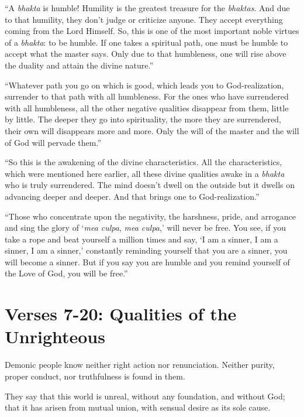 \enquote{A \textit{bhakta} is humble! Humility is the greatest treasure for the \textit{bhaktas}. And due to that humility, they don’t judge or criticize anyone. They accept everything coming from the Lord Himself. So, this is one of the most important noble virtues of a \textit{bhakta}: to be humble. If one takes a spiritual path, one must be humble to accept what the master says. Only due to that humbleness, one will rise above the duality and attain the divine nature.}

\enquote{Whatever path you go on which is good, which leads you to God-realization, surrender to that path with all humbleness. For the ones who have surrendered with all humbleness, all the other negative qualities disappear from them, little by little. The deeper they go into spirituality, the more they are surrendered, their own will disappears more and more. Only the will of the master and the will of God will pervade them.}

\enquote{So this is the awakening of the divine characteristics. All the characteristics, which were mentioned here earlier, all these divine qualities awake in a \textit{bhakta} who is truly surrendered. The mind doesn’t dwell on the outside but it dwells on advancing deeper and deeper. And that brings one to God-realization.}

\enquote{Those who concentrate upon the negativity, the harshness, pride, and arrogance and sing the glory of \enquote{\textit{mea culpa}, \textit{mea culpa},} will never be free. You see, if you take a rope and beat yourself a million times and say, \enquote{I am a sinner, I am a sinner, I am a sinner,} constantly reminding yourself that you are a sinner, you will become a sinner. But if you say you are humble and you remind yourself of the Love of God, you will be free.}

\section{Verses 7-20: Qualities of the Unrighteous}\label{sec-verses-7-20-qualities-of-the-unrighteous}
{Demonic people know neither right action nor renunciation. Neither purity, proper conduct, nor truthfulness is found in them.}

{They say that this world is unreal, without any foundation, and without God; that it has arisen from mutual union, with sensual desire as its sole cause.}

